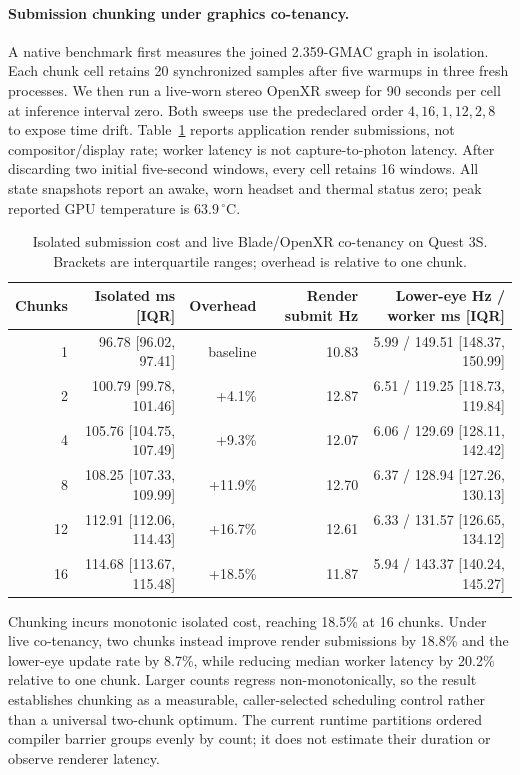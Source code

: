 \paragraph{Submission chunking under graphics co-tenancy.}
A native benchmark first measures the joined 2.359-GMAC graph in isolation.
Each chunk cell retains 20 synchronized samples after five warmups in three
fresh processes. We then run a live-worn stereo OpenXR sweep for 90 seconds
per cell at inference interval zero. Both sweeps use the predeclared order
$4,16,1,12,2,8$ to expose time drift. Table~\ref{tab:dinovision-chunks}
reports application render submissions, not compositor/display rate; worker
latency is not capture-to-photon latency. After discarding two initial
five-second windows, every cell retains 16 windows. All state snapshots report
an awake, worn headset and thermal status zero; peak reported GPU temperature
is $63.9\,^{\circ}$C.

\begin{table}[t]
  \centering
  \caption{Isolated submission cost and live Blade/OpenXR co-tenancy on Quest
  3S. Brackets are interquartile ranges; overhead is relative to one chunk.}
  \label{tab:dinovision-chunks}
  \begin{tabular}{rrrrr}
    \toprule
    Chunks & Isolated ms [IQR] & Overhead & Render submit Hz &
    Lower-eye Hz / worker ms [IQR] \\
    \midrule
     1 & 96.78 [96.02, 97.41] & baseline & 10.83 & 5.99 / 149.51 [148.37, 150.99] \\
     2 & 100.79 [99.78, 101.46] & +4.1\% & 12.87 & 6.51 / 119.25 [118.73, 119.84] \\
     4 & 105.76 [104.75, 107.49] & +9.3\% & 12.07 & 6.06 / 129.69 [128.11, 142.42] \\
     8 & 108.25 [107.33, 109.99] & +11.9\% & 12.70 & 6.37 / 128.94 [127.26, 130.13] \\
    12 & 112.91 [112.06, 114.43] & +16.7\% & 12.61 & 6.33 / 131.57 [126.65, 134.12] \\
    16 & 114.68 [113.67, 115.48] & +18.5\% & 11.87 & 5.94 / 143.37 [140.24, 145.27] \\
    \bottomrule
  \end{tabular}
\end{table}

Chunking incurs monotonic isolated cost, reaching 18.5\% at 16 chunks. Under
live co-tenancy, two chunks instead improve render submissions by 18.8\% and
the lower-eye update rate by 8.7\%, while reducing median worker latency by
20.2\% relative to one chunk. Larger counts regress non-monotonically, so the
result establishes chunking as a measurable, caller-selected scheduling
control rather than a universal two-chunk optimum. The current runtime
partitions ordered compiler barrier groups evenly by count; it does not
estimate their duration or observe renderer latency.

